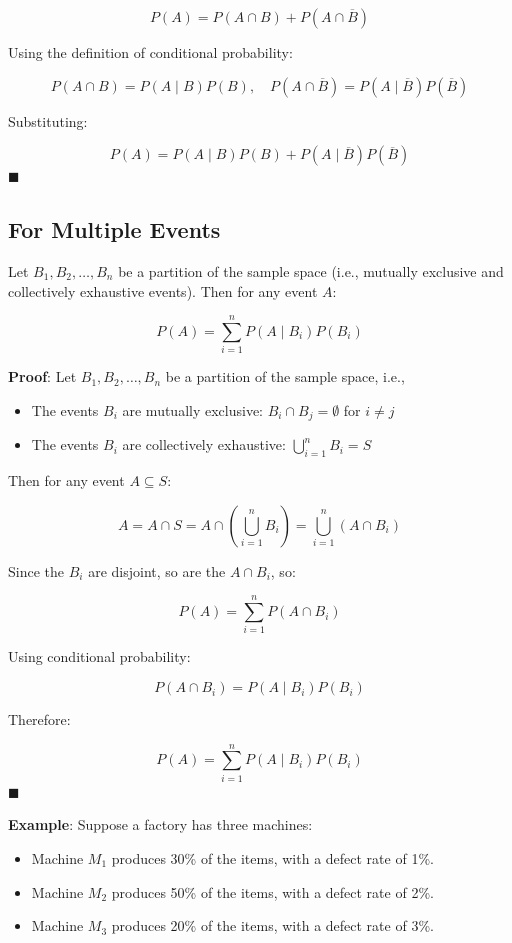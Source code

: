 \documentclass[twoside]{book}
\begin{document}
\[
P(A) = P(A \cap B) + P(A \cap \overline{B})
\]

Using the definition of conditional probability:

\[
P(A \cap B) = P(A \mid B)P(B), \quad P(A \cap \overline{B}) = P(A \mid \overline{B})P(\overline{B})
\]

Substituting:

\[
P(A) = P(A \mid B)P(B) + P(A \mid \overline{B})P(\overline{B})
\]
\hfill\(\blacksquare\)

\subsection{For Multiple Events}

\begin{textbox}

Let \( B_1, B_2, \dots, B_n \) be a partition of the sample space (i.e., mutually exclusive and collectively exhaustive events). Then for any event \( A \):

\[
P(A) = \sum_{i=1}^{n} P(A \mid B_i)P(B_i)
\]
\end{textbox}

\textbf{Proof}: Let \( B_1, B_2, \dots, B_n \) be a partition of the sample space, i.e.,

\begin{itemize}
    \item The events \( B_i \) are mutually exclusive: \( B_i \cap B_j = \emptyset \) for \( i \ne j \)
    \item The events \( B_i \) are collectively exhaustive: \( \bigcup_{i=1}^n B_i = S \)
\end{itemize}

Then for any event \( A \subseteq S \):

\[
A = A \cap S = A \cap \left( \bigcup_{i=1}^n B_i \right) = \bigcup_{i=1}^n (A \cap B_i)
\]

Since the \( B_i \) are disjoint, so are the \( A \cap B_i \), so:

\[
P(A) = \sum_{i=1}^n P(A \cap B_i)
\]

Using conditional probability:

\[
P(A \cap B_i) = P(A \mid B_i)P(B_i)
\]

Therefore:

\[
P(A) = \sum_{i=1}^n P(A \mid B_i)P(B_i)
\]
\hfill\(\blacksquare\)

\textbf{Example}: Suppose a factory has three machines:

\begin{itemize}
    \item Machine \( M_1 \) produces 30\% of the items, with a defect rate of 1\%.
    \item Machine \( M_2 \) produces 50\% of the items, with a defect rate of 2\%.
    \item Machine \( M_3 \) produces 20\% of the items, with a defect rate of 3\%.
\end{itemize}
\end{document}
